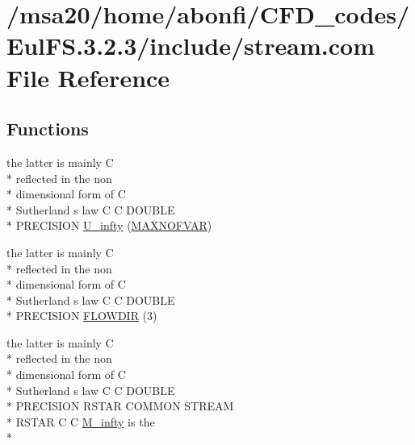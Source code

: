 \hypertarget{msa20_2home_2abonfi_2_c_f_d__codes_2_eul_f_s_83_82_83_2include_2stream_8com}{\section{/msa20/home/abonfi/\-C\-F\-D\-\_\-codes/\-Eul\-F\-S.3.2.3/include/stream.com File Reference}
\label{msa20_2home_2abonfi_2_c_f_d__codes_2_eul_f_s_83_82_83_2include_2stream_8com}
}
\subsection*{Functions}
\begin{DoxyCompactItemize}
\item 
the latter is mainly C \\*
reflected in the non \\*
dimensional form of C \\*
Sutherland s law C C D\-O\-U\-B\-L\-E \\*
P\-R\-E\-C\-I\-S\-I\-O\-N \hyperlink{msa20_2home_2abonfi_2_c_f_d__codes_2_eul_f_s_83_82_83_2include_2stream_8com_a3306f725a42d6173548f0867aa4313ef}{U\-\_\-infty} (\hyperlink{msa20_2home_2abonfi_2_c_f_d__codes_2_eul_f_s_83_82_83_2include_2paramt_8h_ae08fa28f58a75033834af08d1f9359ce}{M\-A\-X\-N\-O\-F\-V\-A\-R})
\item 
the latter is mainly C \\*
reflected in the non \\*
dimensional form of C \\*
Sutherland s law C C D\-O\-U\-B\-L\-E \\*
P\-R\-E\-C\-I\-S\-I\-O\-N \hyperlink{msa20_2home_2abonfi_2_c_f_d__codes_2_eul_f_s_83_82_83_2include_2stream_8com_a52f84db6b16caac3d51050972a7612c7}{F\-L\-O\-W\-D\-I\-R} (3)
\item 
the latter is mainly C \\*
reflected in the non \\*
dimensional form of C \\*
Sutherland s law C C D\-O\-U\-B\-L\-E \\*
P\-R\-E\-C\-I\-S\-I\-O\-N R\-S\-T\-A\-R C\-O\-M\-M\-O\-N S\-T\-R\-E\-A\-M \\*
R\-S\-T\-A\-R C C \hyperlink{msa20_2home_2abonfi_2_c_f_d__codes_2_eul_f_s_83_82_83_2include_2stream_8com_a57c765efd76d44669f6966962bda2d72}{M\-\_\-infty} is the \\*

\end{DoxyCompactItemize}
